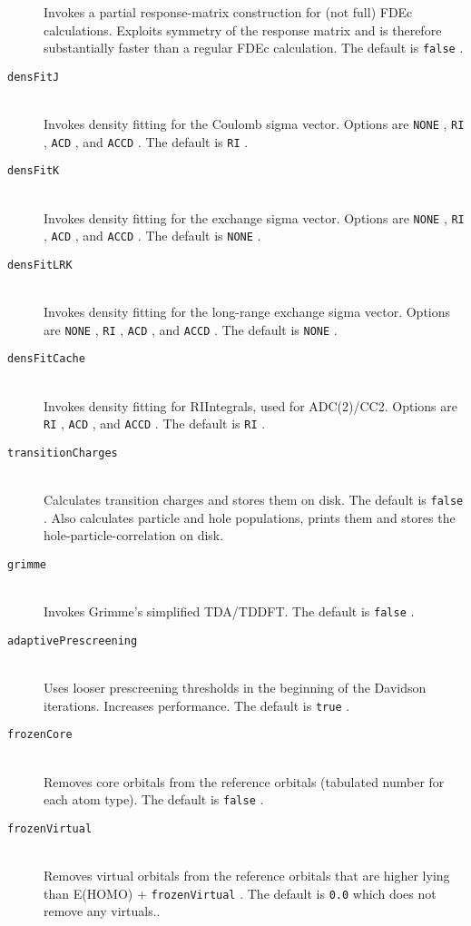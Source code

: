 \documentclass[bibliography=totocnumbered,a4paper,10pt,oneside]{scrbook}
\newcommand{\ttt}[1]{%
  \begingroup\setlength{\fboxsep}{1pt}%
  \colorbox{serenity-green!30}{\texttt{\hspace*{2pt}\vphantom{(g}#1\hspace*{2pt}}}%
  \endgroup
}
\begin{document}
\begin{description}
    Invokes a partial response-matrix construction for (not full) FDEc calculations.
    Exploits symmetry of the response matrix and is therefore substantially faster than
    a regular FDEc calculation.
    The default is \ttt{false}.
    \item[\texttt{densFitJ}]\hfill\\
    Invokes density fitting for the Coulomb sigma vector. 
    Options are \ttt{NONE}, \ttt{RI}, \ttt{ACD}, and \ttt{ACCD}. The default is \ttt{RI}.
    \item[\texttt{densFitK}]\hfill\\
    Invokes density fitting for the exchange sigma vector. 
    Options are \ttt{NONE}, \ttt{RI}, \ttt{ACD}, and \ttt{ACCD}. The default is \ttt{NONE}.
    \item[\texttt{densFitLRK}]\hfill\\
    Invokes density fitting for the long-range exchange sigma vector. 
    Options are \ttt{NONE}, \ttt{RI}, \ttt{ACD}, and \ttt{ACCD}. The default is \ttt{NONE}.
    \item[\texttt{densFitCache}]\hfill\\
    Invokes density fitting for RIIntegrals, used for ADC(2)/CC2. 
    Options are \ttt{RI}, \ttt{ACD}, and \ttt{ACCD}. The default is \ttt{RI}.
    \item[\texttt{transitionCharges}]\hfill\\
    Calculates transition charges and stores them on disk. The default is \ttt{false}. Also calculates particle and hole populations, prints them and stores the hole-particle-correlation on disk.
    \item[\texttt{grimme}]\hfill\\
    Invokes Grimme's simplified TDA/TDDFT. The default is \ttt{false}.
    \item[\texttt{adaptivePrescreening}]\hfill\\
    Uses looser prescreening thresholds in the beginning of the Davidson iterations. Increases performance. The default is \ttt{true}.
    \item[\texttt{frozenCore}]\hfill\\
    Removes core orbitals from the reference orbitals (tabulated number for each atom type). The default is \ttt{false}.
    \item[\texttt{frozenVirtual}]\hfill\\
    Removes virtual orbitals from the reference orbitals that are higher lying than E(HOMO) + \ttt{frozenVirtual}. The default is \ttt{0.0} which does not remove any virtuals..

\end{description}
\end{document}
